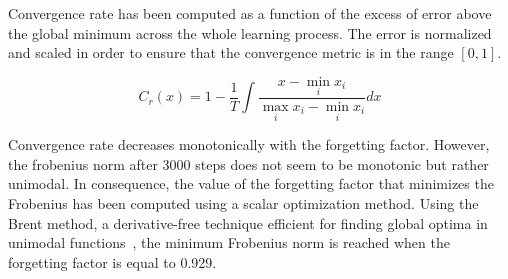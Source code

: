 Convergence rate has been computed as a function of the excess of error above the global minimum
across the whole learning process. The error is normalized and scaled in order to ensure that
the convergence metric is in the range $[0, 1]$.

\begin{equation}
    C_r(x) = 1 - \frac{1}{T} \int \frac{x - \min_i x_i}{\max_i x_i - \min_i x_i} dx
\end{equation}

Convergence rate decreases monotonically with the forgetting factor.
However, the frobenius norm after 3000 steps does not seem to be monotonic
but rather unimodal. In consequence, the value of the forgetting factor that
minimizes the Frobenius has been computed using a scalar optimization method.
Using the Brent method, a derivative-free technique efficient for finding global optima
in unimodal functions~\cite{basso1982iterative}, the minimum Frobenius norm is reached
when the forgetting factor is equal to 0.929.
